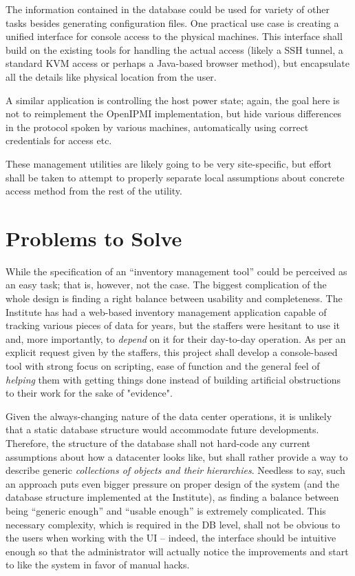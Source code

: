 \documentclass{article}
\begin{document}
The information contained in the database could be used for variety of other tasks besides generating configuration files.  One
practical use case is creating a unified interface for console access to the physical machines.  This interface shall build on the
existing tools for handling the actual access (likely a SSH tunnel, a standard KVM access or perhaps a Java-based browser method),
but encapsulate all the details like physical location from the user.

A similar application is controlling the host power state; again, the goal here is not to reimplement the OpenIPMI implementation,
but hide various differences in the protocol spoken by various machines, automatically using correct credentials for access etc.

These management utilities are likely going to be very site-specific, but effort shall be taken to attempt to properly separate
local assumptions about concrete access method from the rest of the utility.

\section{Problems to Solve}

While the specification of an ``inventory management tool'' could be perceived as an easy task; that is, however, not the case.
The biggest complication of the whole design is finding a right balance between usability and completeness.  The Institute has had
a web-based inventory management application capable of tracking various pieces of data for years, but the staffers were hesitant
to use it and, more importantly, to {\em depend} on it for their day-to-day operation.  As per an explicit request given by the
staffers, this project shall develop a console-based tool with strong focus on scripting, ease of function and the general feel of
{\em helping} them with getting things done instead of building artificial obstructions to their work for the sake of "evidence".

Given the always-changing nature of the data center operations, it is unlikely that a static database structure would accommodate
future developments.  Therefore, the structure of the database shall not hard-code any current assumptions about how a datacenter
looks like, but shall rather provide a way to describe generic {\em collections of objects and their hierarchies}.  Needless to
say, such an approach puts even bigger pressure on proper design of the system (and the database structure implemented at the
Institute), as finding a balance between being ``generic enough'' and ``usable enough'' is extremely complicated.  This necessary
complexity, which is required in the DB level, shall not be obvious to the users when working with the UI -- indeed, the interface
should be intuitive enough so that the administrator will actually notice the improvements and start to like the system in favor
of manual hacks.
\end{document}
